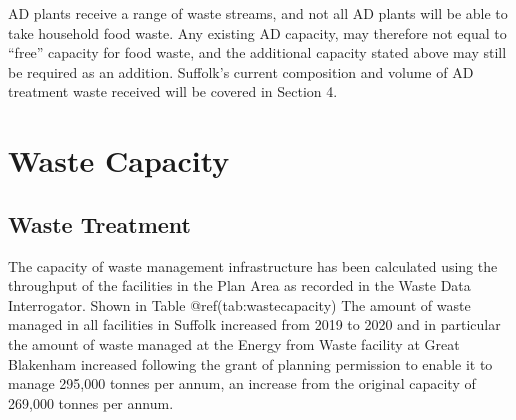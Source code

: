 \documentclass[
]{article}
\begin{document}
AD plants receive a range of waste streams, and not all AD plants will
be able to take household food waste. Any existing AD capacity, may
therefore not equal to ``free'' capacity for food waste, and the
additional capacity stated above may still be required as an addition.
Suffolk's current composition and volume of AD treatment waste received
will be covered in Section 4.

\newpage

\hypertarget{waste-capacity}{%
\section{Waste Capacity}\label{waste-capacity}}

\hypertarget{waste-treatment}{%
\subsection{Waste Treatment}\label{waste-treatment}}

The capacity of waste management infrastructure has been calculated
using the throughput of the facilities in the Plan Area as recorded in
the Waste Data Interrogator. Shown in Table @ref(tab:wastecapacity) The
amount of waste managed in all facilities in Suffolk increased from 2019
to 2020 and in particular the amount of waste managed at the Energy from
Waste facility at Great Blakenham increased following the grant of
planning permission to enable it to manage 295,000 tonnes per annum, an
increase from the original capacity of 269,000 tonnes per annum.

\providecommand{\docline}[3]{\noalign{\global\setlength{\arrayrulewidth}{#1}}\arrayrulecolor[HTML]{#2}\cline{#3}}

\setlength{\tabcolsep}{0pt}

\renewcommand*{\arraystretch}{1.5}
\end{document}
